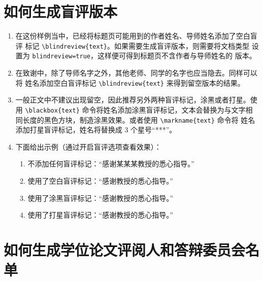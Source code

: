 \documentclass[lang=chs, degree=phd, blindreview=false, winfonts=true, academic=true]{yanputhesis}
\begin{document}
\section{如何生成盲评版本}

\begin{enumerate}
    \setlength{\itemsep}{0pt}
    \item 在这份样例当中，已经将标题页可能用到的作者姓名、导师姓名添加了空白盲评
          标记 \lstinline`\blindreview{text}`。如果需要生成盲评版本，则需要将文档类型
          设置为 \lstinline`blindreview=true`，这样便可得到标题页不含作者与导师姓名的
          版本。
    \item 在致谢中，除了导师名字之外，其他老师、同学的名字也应当隐去。同样可以将
          姓名添加空白盲评标记 \lstinline`\blindreview{text}` 来得到留空版本的结果。
    \item 一般正文中不建议出现留空，因此推荐另外两种盲评标记，涂黑或者打星。使用
          \lstinline`\blackbox{text}` 命令将姓名添加涂黑盲评标记，文本会替换为与文字相
          同长度的黑色方块，制造涂黑效果。或者使用 \lstinline`\markname{text}` 命令将
          姓名添加打星盲评标记，姓名将替换成 3 个星号“***”。
    \item 下面给出示例（通过开启盲评选项查看效果）：
          \begin{enumerate}
              \setlength{\itemsep}{0pt}
              \item 不添加任何盲评标记：“感谢某某某教授的悉心指导。”
              \item 使用了空白盲评标记：“感谢教授的悉心指导。”
              \item 使用了涂黑盲评标记：“感谢教授的悉心指导。”
              \item 使用了打星盲评标记：“感谢教授的悉心指导。”
          \end{enumerate}
\end{enumerate}

\section{如何生成学位论文评阅人和答辩委员会名单}
\end{document}
